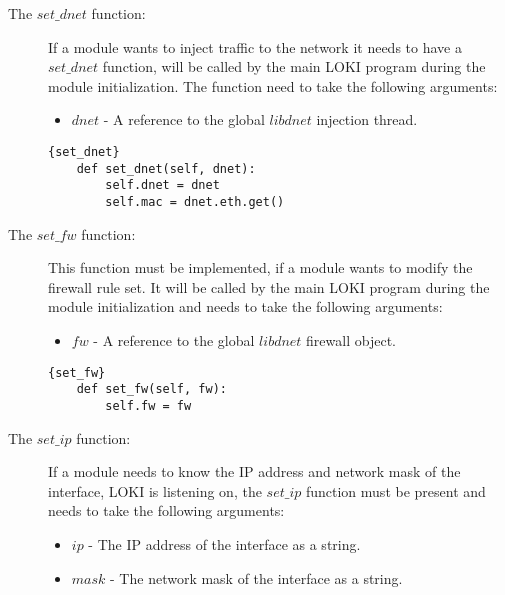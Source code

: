 \documentclass[a4paper, 11pt]{article}
\begin{document}
                \begin{description}
                    \item[The $set\_dnet$ function:] If a module wants to inject traffic to the network it needs to have a $set\_dnet$ function, will be called by the main LOKI program during the module initialization. The function need to take the following arguments:
                        \begin{itemize}
                            \item $dnet$ - A reference to the global $libdnet$ injection thread.
                        \end{itemize}

                    \begin{lstlisting}[caption=Get the libdnet object]{set_dnet}
    def set_dnet(self, dnet):
        self.dnet = dnet
        self.mac = dnet.eth.get()
                    \end{lstlisting}
                    
                    \item[The $set\_fw$ function:] This function must be implemented, if a module wants to modify the firewall rule set. It will be called by the main LOKI program during the module initialization and needs to take the following arguments:
                        \begin{itemize}
                            \item $fw$ - A reference to the global $libdnet$ firewall object.
                        \end{itemize}
                        
                    \begin{lstlisting}[caption=Get the firewall object]{set_fw}
    def set_fw(self, fw):
        self.fw = fw
                    \end{lstlisting}

                    \item[The $set\_ip$ function:] If a module needs to know the IP address and network mask of the interface, LOKI is listening on, the $set\_ip$ function must be present and needs to take the following arguments:
                        \begin{itemize}
                            \item $ip$ - The IP address of the interface as a string.
                            \item $mask$ - The network mask of the interface as a string.
                        \end{itemize}


\end{description}
\end{document}
